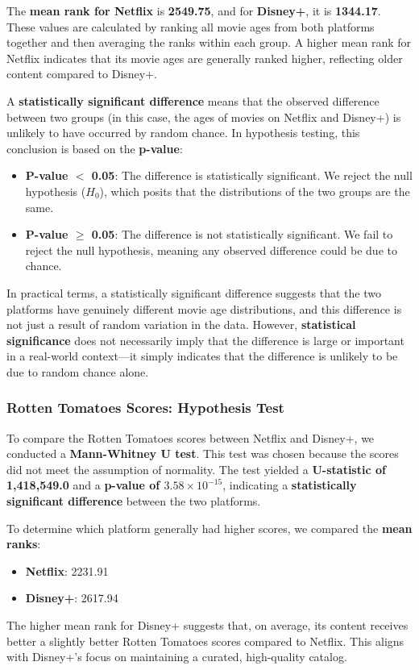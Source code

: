 The \textbf{mean rank for Netflix} is \textbf{2549.75}, and for \textbf{Disney+}, it is \textbf{1344.17}. These values are calculated by ranking all movie ages from both platforms together and then averaging the ranks within each group. A higher mean rank for Netflix indicates that its movie ages are generally ranked higher, reflecting older content compared to Disney+.

A \textbf{statistically significant difference} means that the observed difference between two groups (in this case, the ages of movies on Netflix and Disney+) is unlikely to have occurred by random chance. In hypothesis testing, this conclusion is based on the \textbf{p-value}:

\begin{itemize}
    \item \textbf{P-value $<$ 0.05}: The difference is statistically significant. We reject the null hypothesis (\(H_0\)), which posits that the distributions of the two groups are the same.
    \item \textbf{P-value $\geq$ 0.05}: The difference is not statistically significant. We fail to reject the null hypothesis, meaning any observed difference could be due to chance.
\end{itemize}

In practical terms, a statistically significant difference suggests that the two platforms have genuinely different movie age distributions, and this difference is not just a result of random variation in the data. However, \textbf{statistical significance} does not necessarily imply that the difference is large or important in a real-world context—it simply indicates that the difference is unlikely to be due to random chance alone.

\subsubsection{Rotten Tomatoes Scores: Hypothesis Test}
To compare the Rotten Tomatoes scores between Netflix and Disney+, we conducted a \textbf{Mann-Whitney U test}. This test was chosen because the scores did not meet the assumption of normality. The test yielded a \textbf{U-statistic of 1,418,549.0} and a \textbf{p-value of \(3.58 \times 10^{-15}\)}, indicating a \textbf{statistically significant difference} between the two platforms.

To determine which platform generally had higher scores, we compared the \textbf{mean ranks}:
\begin{itemize}
    \item \textbf{Netflix}: 2231.91
    \item \textbf{Disney+}: 2617.94
\end{itemize}

The higher mean rank for Disney+ suggests that, on average, its content receives better a slightly better Rotten Tomatoes scores compared to Netflix. This aligns with Disney+'s focus on maintaining a curated, high-quality catalog.
